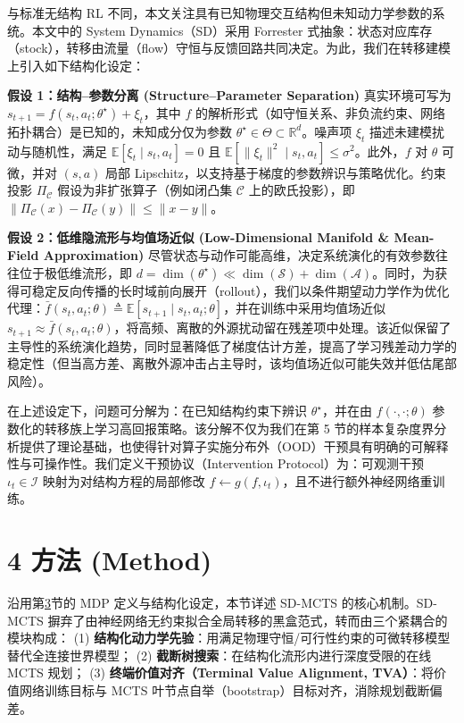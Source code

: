 \documentclass[UTF8]{ctexart}
\begin{document}
与标准无结构 RL 不同，本文关注具有已知物理交互结构但未知动力学参数的系统。本文中的 System Dynamics（SD）采用 Forrester 式抽象：状态对应库存（stock），转移由流量（flow）守恒与反馈回路共同决定。为此，我们在转移建模上引入如下结构化设定：

\textbf{假设 1：结构--参数分离 (Structure--Parameter Separation)}
真实环境可写为 \( s_{t+1}=f(s_t,a_t;\theta^\star)+\xi_t \)，其中 \(f\)
的解析形式（如守恒关系、非负流约束、网络拓扑耦合）是已知的，未知成分仅为参数
\(\theta^\star\in\Theta\subset\mathbb{R}^d\)。噪声项 \(\xi_t\)
描述未建模扰动与随机性，满足 \(\mathbb{E}[\xi_t\mid s_t,a_t]=0\) 且
\(\mathbb{E}\!\left[\|\xi_t\|^2\mid s_t,a_t\right]\le \sigma^2\)。此外，\(f\)
对 \(\theta\) 可微，并对 \((s,a)\) 局部
Lipschitz，以支持基于梯度的参数辨识与策略优化。约束投影 \(\Pi_{\mathcal{C}}\) 假设为非扩张算子（例如闭凸集 \(\mathcal{C}\) 上的欧氏投影），即 \(\|\Pi_{\mathcal{C}}(x)-\Pi_{\mathcal{C}}(y)\|\le \|x-y\|\)。

\textbf{假设 2：低维隐流形与均值场近似 (Low-Dimensional Manifold \&
Mean-Field Approximation)}
尽管状态与动作可能高维，决定系统演化的有效参数往往位于极低维流形，即
\(d=\dim(\theta^\star)\ll \dim(\mathcal{S})+\dim(\mathcal{A})\)。同时，为获得可稳定反向传播的长时域前向展开（rollout），我们以条件期望动力学作为优化代理：\(\bar f(s_t,a_t;\theta)\triangleq \mathbb{E}[s_{t+1}\mid s_t,a_t;\theta]\)，并在训练中采用均值场近似
\(s_{t+1}\approx \bar f(s_t,a_t;\theta)\)，将高频、离散的外源扰动留在残差项中处理。该近似保留了主导性的系统演化趋势，同时显著降低了梯度估计方差，提高了学习残差动力学的稳定性（但当高方差、离散外源冲击占主导时，该均值场近似可能失效并低估尾部风险）。

在上述设定下，问题可分解为：在已知结构约束下辨识 \(\theta^\star\)，并在由
\(f(\cdot,\cdot;\theta)\)
参数化的转移族上学习高回报策略。该分解不仅为我们在第 5
节的样本复杂度界分析提供了理论基础，也使得针对算子实施分布外（OOD）干预具有明确的可解释性与可操作性。我们定义干预协议（Intervention Protocol）为：可观测干预 \(\iota_t\in\mathcal{I}\) 映射为对结构方程的局部修改 \(f \leftarrow g(f,\iota_t)\)，且不进行额外神经网络重训练。

\hypertarget{sec-method}{%
\section{4 方法 (Method)}\label{sec-method}}

沿用第\hyperlink{sec-problem-setup}{3}节的 MDP 定义与结构化设定，本节详述 SD-MCTS 的核心机制。SD-MCTS 摒弃了由神经网络无约束拟合全局转移的黑盒范式，转而由三个紧耦合的模块构成：
(1) \textbf{结构化动力学先验}：用满足物理守恒/可行性约束的可微转移模型替代全连接世界模型；
(2) \textbf{截断树搜索}：在结构化流形内进行深度受限的在线 MCTS 规划；
(3) \textbf{终端价值对齐（Terminal Value Alignment, TVA）}：将价值网络训练目标与 MCTS 叶节点自举（bootstrap）目标对齐，消除规划截断偏差。
\end{document}
